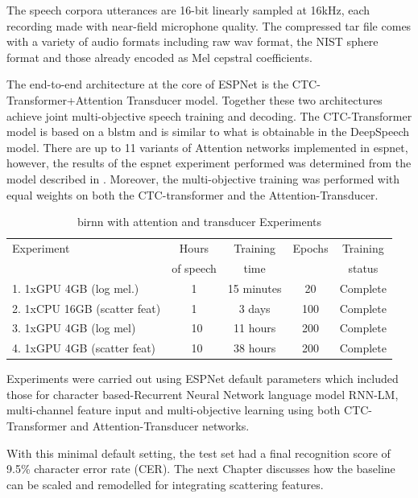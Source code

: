 The speech corpora utterances are 16-bit linearly sampled at 16kHz, each recording made with near-field microphone quality.  The compressed tar file comes with a variety of audio formats including raw wav format, the NIST sphere format and those already encoded as Mel cepstral coefficients.

The end-to-end architecture at the core of ESPNet is the CTC-Transformer+Attention Transducer model.  Together these two architectures achieve joint multi-objective speech training and decoding.  The CTC-Transformer model is based on a \acrshort{blstm} and is similar to what is obtainable in the DeepSpeech model.  There are up to 11 variants of Attention networks implemented in \acrshort{espnet}, however, the results of the \acrshort{espnet} experiment performed was determined from the model described in \cite{chorowski2015attention}.  Moreover, the multi-objective training was performed with equal weights on both the CTC-transformer and the Attention-Transducer.  

\begin{table}
  \caption{\acrshort{birnn} with attention and transducer Experiments}
  \label{tab_c6_03_training}
\begin{tabular}{lcccc}
\toprule
Experiment & Hours & Training  & Epochs & Training \\
& of speech & time & & status \\
\midrule
1. 1xGPU 4GB (log mel.) & 1 & 15 minutes & 20 & Complete\\
2. 1xCPU 16GB (scatter feat) & 1 & 3 days & 100 & Complete\\
3. 1xGPU 4GB (log mel) & ~10 & 11 hours & 200 & Complete\\
4. 1xGPU 4GB (scatter feat) & ~10 & 38 hours & 200 & Complete\\
\bottomrule
\end{tabular}
\end{table}
Experiments were carried out using ESPNet default parameters which included those for character based-Recurrent Neural Network language model RNN-LM, multi-channel feature input and multi-objective learning using both CTC-Transformer and Attention-Transducer networks.

With this minimal default setting, the test set had a final recognition score of 9.5\% character error rate (CER).  The next Chapter discusses how the baseline can be scaled and remodelled for integrating scattering features.

